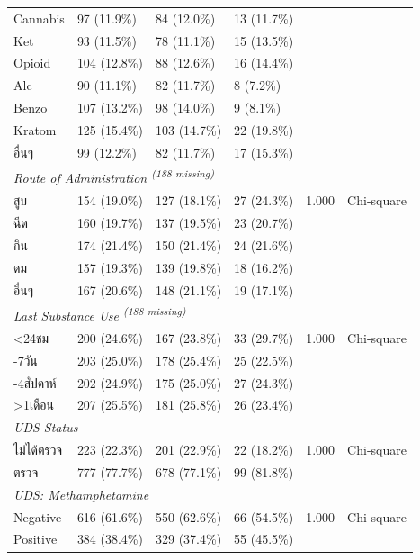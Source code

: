 \begin{table}[htbp]
\begin{tabular}{llllll}
\quad Cannabis & 97 (11.9\%) & 84 (12.0\%) & 13 (11.7\%) &  &  \\
\quad Ket & 93 (11.5\%) & 78 (11.1\%) & 15 (13.5\%) &  &  \\
\quad Opioid & 104 (12.8\%) & 88 (12.6\%) & 16 (14.4\%) &  &  \\
\quad Alc & 90 (11.1\%) & 82 (11.7\%) & 8 (7.2\%) &  &  \\
\quad Benzo & 107 (13.2\%) & 98 (14.0\%) & 9 (8.1\%) &  &  \\
\quad Kratom & 125 (15.4\%) & 103 (14.7\%) & 22 (19.8\%) &  &  \\
\quad อื่นๆ & 99 (12.2\%) & 82 (11.7\%) & 17 (15.3\%) &  &  \\
\multicolumn{6}{l}{\textit{Route of Administration \textsuperscript{(188 missing)}}} \\
\quad สูบ & 154 (19.0\%) & 127 (18.1\%) & 27 (24.3\%) & 1.000 & Chi-square \\
\quad ฉีด & 160 (19.7\%) & 137 (19.5\%) & 23 (20.7\%) &  &  \\
\quad กิน & 174 (21.4\%) & 150 (21.4\%) & 24 (21.6\%) &  &  \\
\quad ดม & 157 (19.3\%) & 139 (19.8\%) & 18 (16.2\%) &  &  \\
\quad อื่นๆ & 167 (20.6\%) & 148 (21.1\%) & 19 (17.1\%) &  &  \\
\multicolumn{6}{l}{\textit{Last Substance Use \textsuperscript{(188 missing)}}} \\
\quad \textless{}24ชม & 200 (24.6\%) & 167 (23.8\%) & 33 (29.7\%) & 1.000 & Chi-square \\
\quad 1-7วัน & 203 (25.0\%) & 178 (25.4\%) & 25 (22.5\%) &  &  \\
\quad 1-4สัปดาห์ & 202 (24.9\%) & 175 (25.0\%) & 27 (24.3\%) &  &  \\
\quad \textgreater{}1เดือน & 207 (25.5\%) & 181 (25.8\%) & 26 (23.4\%) &  &  \\
\multicolumn{6}{l}{\textit{UDS Status}} \\
\quad ไม่ได้ตรวจ & 223 (22.3\%) & 201 (22.9\%) & 22 (18.2\%) & 1.000 & Chi-square \\
\quad ตรวจ & 777 (77.7\%) & 678 (77.1\%) & 99 (81.8\%) &  &  \\
\multicolumn{6}{l}{\textit{UDS: Methamphetamine}} \\
\quad Negative & 616 (61.6\%) & 550 (62.6\%) & 66 (54.5\%) & 1.000 & Chi-square \\
\quad Positive & 384 (38.4\%) & 329 (37.4\%) & 55 (45.5\%) &  &  \\

\end{tabular}
\end{table}
